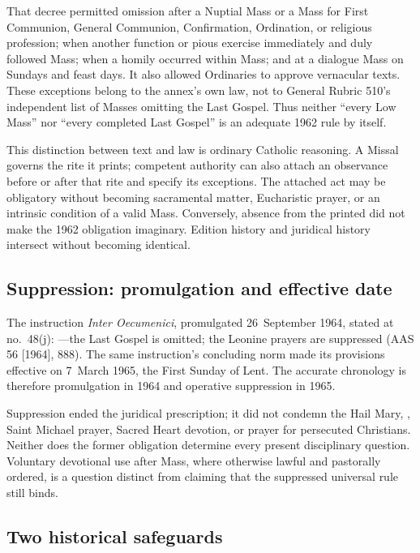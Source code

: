 That decree permitted omission after a Nuptial Mass or a Mass for First Communion, General Communion, Confirmation, Ordination, or religious profession; when another function or pious exercise immediately and duly followed Mass; when a homily occurred within Mass; and at a dialogue Mass on Sundays and feast days. It also allowed Ordinaries to approve vernacular texts. These exceptions belong to the annex's own law, not to General Rubric 510's independent list of Masses omitting the Last Gospel. Thus neither “every Low Mass” nor “every completed Last Gospel” is an adequate 1962 rule by itself.

This distinction between text and law is ordinary Catholic reasoning. A Missal governs the rite it prints; competent authority can also attach an observance before or after that rite and specify its exceptions. The attached act may be obligatory without becoming sacramental matter, Eucharistic prayer, or an intrinsic condition of a valid Mass. Conversely, absence from the printed  did not make the 1962 obligation imaginary. Edition history and juridical history intersect without becoming identical.

\subsection*{Suppression: promulgation and effective date}

The instruction \emph{Inter Oecumenici}, promulgated 26~September 1964, stated at no.~48(j): ---the Last Gospel is omitted; the Leonine prayers are suppressed (AAS 56 [1964], 888). The same instruction's concluding norm made its provisions effective on 7~March 1965, the First Sunday of Lent. The accurate chronology is therefore promulgation in 1964 and operative suppression in 1965.

Suppression ended the juridical prescription; it did not condemn the Hail Mary, , Saint Michael prayer, Sacred Heart devotion, or prayer for persecuted Christians. Neither does the former obligation determine every present disciplinary question. Voluntary devotional use after Mass, where otherwise lawful and pastorally ordered, is a question distinct from claiming that the suppressed universal rule still binds.

\subsection*{Two historical safeguards}

